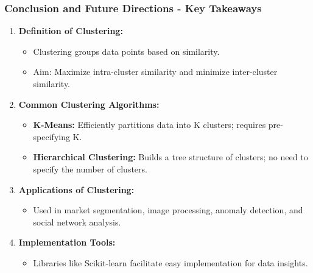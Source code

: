 \documentclass[aspectratio=169]{beamer}
\begin{document}
\begin{frame}[fragile]
    \frametitle{Conclusion and Future Directions - Key Takeaways}
    \begin{enumerate}
        \item \textbf{Definition of Clustering:}
        \begin{itemize}
            \item Clustering groups data points based on similarity.
            \item Aim: Maximize intra-cluster similarity and minimize inter-cluster similarity.
        \end{itemize}
        
        \item \textbf{Common Clustering Algorithms:}
        \begin{itemize}
            \item \textbf{K-Means:} Efficiently partitions data into K clusters; requires pre-specifying K.
            \item \textbf{Hierarchical Clustering:} Builds a tree structure of clusters; no need to specify the number of clusters.
        \end{itemize}

        \item \textbf{Applications of Clustering:}
        \begin{itemize}
            \item Used in market segmentation, image processing, anomaly detection, and social network analysis.
        \end{itemize}

        \item \textbf{Implementation Tools:}
        \begin{itemize}
            \item Libraries like Scikit-learn facilitate easy implementation for data insights.
        \end{itemize}
    \end{enumerate}
\end{frame}
\end{document}
